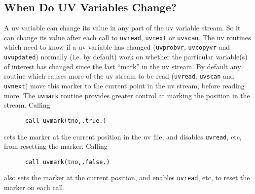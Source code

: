 \documentclass{report}
\begin{document}
\subsection{When Do UV Variables Change?}
\label{sect:uvchanges}
A uv variable can change its value in any part of the
uv variable stream. So it can change its value after each call to
{\tt uvread}, {\tt uvnext} or {\tt uvscan}. The uv routines which need to
know if a uv variable has changed ({\tt uvprobvr}, {\tt uvcopyvr} and
{\tt uvupdated}) normally (i.e. by default) work on whether the particular
variable(s) of interest has changed since the last ``mark'' in the uv stream.
By default any routine which
causes more of the uv stream to be read ({\tt uvread}, {\tt uvscan} and
{\tt uvnext}) move this marker to the current point in the uv stream, before
reading more. The {\tt uvmark} routine provides greater control at
marking the position in the stream. Calling
\begin{verbatim}
      call uvmark(tno,.true.)
\end{verbatim}
sets the marker at the current position in the uv file, and disables
{\tt uvread}, etc, from resetting the marker. Calling
\begin{verbatim}
      call uvmark(tno,.false.)
\end{verbatim}
also sets the marker at the current position, and enables {\tt uvread}, etc,
to reset the marker on each call.
\end{document}
